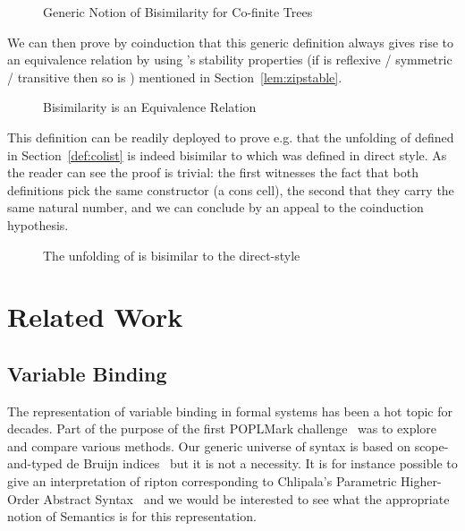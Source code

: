 \begin{figure}[h]
\caption{Generic Notion of Bisimilarity for Co-finite Trees}
\end{figure}

We can then prove by coinduction that this generic definition always gives
rise to an equivalence relation by using 's stability properties
(if  is reflexive / symmetric / transitive then so is {  })
mentioned in Section~\ref{lem:zipstable}.

\begin{figure}[h]
\caption{Bisimilarity is an Equivalence Relation}
\end{figure}

This definition can be readily deployed to prove e.g. that the unfolding
of  defined in Section~\ref{def:colist} is indeed bisimilar to 
which was defined in direct style. As the reader can see the proof is
trivial: the first  witnesses the fact that both definitions
pick the same constructor (a cons cell), the second that they carry the
same natural number, and we can conclude by an appeal to the coinduction
hypothesis.

\begin{figure}[h]
\caption{The unfolding of  is bisimilar to the direct-style }
\end{figure}




\section{Related Work}

\subsection{Variable Binding} The representation of variable binding
in formal systems has been a hot topic for decades. Part of the purpose
of the first POPLMark challenge~\citeyear{poplmark} was to explore and
compare various methods. Our generic universe of syntax is based on
scope-and-typed de Bruijn indices~\cite{de1972lambda} but it is not
a necessity. It is for instance possible to give an interpretation
of ripton corresponding to Chlipala's Parametric Higher-Order
Abstract Syntax~\citeyear{chlipala2008parametric} and we would be interested
to see what the appropriate notion of Semantics is for this representation.

